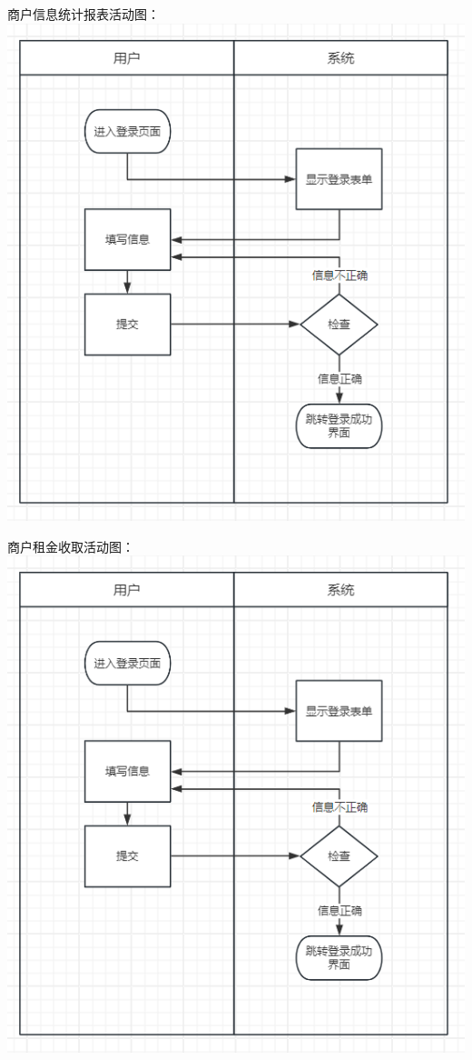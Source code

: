 \documentclass[]{article}
\begin{document}
商户信息统计报表活动图：
\includegraphics{media/media/image1.png}

商户租金收取活动图：
\includegraphics{media/media/image1.png}
\end{document}
